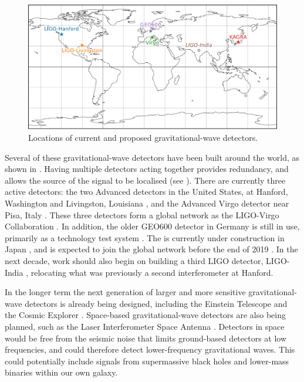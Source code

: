 \begin{colsection}
\begin{figure}[t]
    \begin{center}
        \includegraphics[width=0.95\linewidth]{images/global.pdf}
    \end{center}
    \caption[Locations of gravitational-wave detectors]{
        Locations of current and proposed gravitational-wave detectors.
        }\label{fig:global}
\end{figure}

Several of these gravitational-wave detectors have been built around the world, as shown in . Having multiple detectors acting together provides redundancy, and allows the source of the signal to be localised (see ). There are currently three active detectors: the two Advanced  detectors in the United States, at Hanford, Washington and Livingston, Louisiana \citep{LIGO}, and the  Advanced Virgo detector near Pisa, Italy \citep{Virgo}. These three detectors form a global network as the LIGO-Virgo Collaboration  \citep[LVC,][]{LIGO-Virgo}. In addition, the older GEO600 detector in Germany is still in use, primarily as a technology test system \citep{GEO600}. The  is currently under construction in Japan \citep{KAGRA}, and is expected to join the global network before the end of 2019 \citep{LIGO-Virgo-KAGRA}. In the next decade, work should also begin on building a third LIGO detector, LIGO-India \citep{LIGO_India}, relocating what was previously a second interferometer at Hanford.

In the longer term the next generation of larger and more sensitive gravitational-wave detectors is already being designed, including the Einstein Telescope \citep{EinsteinTelescope} and the Cosmic Explorer \citep{CosmicExplorer}. Space-based gravitational-wave detectors are also being planned, such as the Laser Interferometer Space Antenna  \citep[LISA,][]{LISA}. Detectors in space would be free from the seismic noise that limits ground-based detectors at low frequencies, and could therefore detect lower-frequency gravitational waves. This could potentially include signals from supermassive black holes and lower-mass binaries within our own galaxy.

\newpage

\end{colsection}

